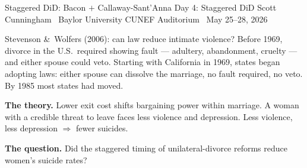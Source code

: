 \documentclass[aspectratio=169,11pt]{beamer}
\begin{document}

\codechellatitle
  {Staggered DiD: Bacon $+$ Callaway-Sant'Anna}
  {Day 4: Staggered DiD}
  {Scott Cunningham \textperiodcentered\ Baylor University}
  {CUNEF Auditorium \textperiodcentered\ May 25--28, 2026}

\begin{frame}{Stevenson \&\ Wolfers (2006): can law reduce intimate violence?}
\vspace{0.4em}
Before 1969, divorce in the U.S.\ required showing fault --- adultery, abandonment, cruelty --- and either spouse could veto. \;Starting with California in 1969, states began adopting  laws: either spouse can dissolve the marriage, no fault required, no veto. \;By 1985 most states had moved.

\vspace{0.6em}
\textbf{The theory.} \;Lower exit cost shifts bargaining power within marriage. \;A woman with a credible threat to leave faces less violence and depression. \;Less violence, less depression $\Rightarrow$ fewer suicides.

\vspace{0.6em}
\textbf{The question.} \;Did the staggered timing of unilateral-divorce reforms reduce women's suicide rates?

\vspace{0.4em}
\end{frame}
\end{document}

